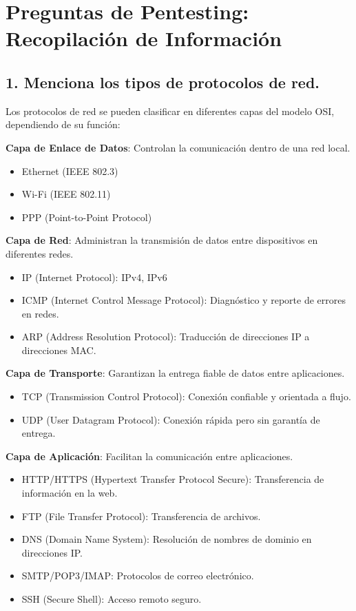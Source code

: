\section{Preguntas de Pentesting: Recopilación de Información}

\subsection{1. Menciona los tipos de protocolos de red.}
Los protocolos de red se pueden clasificar en diferentes capas del modelo OSI, dependiendo de su función:

\textbf{Capa de Enlace de Datos}: Controlan la comunicación dentro de una red local.
\begin{itemize}
    \item Ethernet (IEEE 802.3)
    \item Wi-Fi (IEEE 802.11)
    \item PPP (Point-to-Point Protocol)
\end{itemize}

\textbf{Capa de Red}: Administran la transmisión de datos entre dispositivos en diferentes redes.
\begin{itemize}
    \item IP (Internet Protocol): IPv4, IPv6
    \item ICMP (Internet Control Message Protocol): Diagnóstico y reporte de errores en redes.
    \item ARP (Address Resolution Protocol): Traducción de direcciones IP a direcciones MAC.
\end{itemize}

\textbf{Capa de Transporte}: Garantizan la entrega fiable de datos entre aplicaciones.
\begin{itemize}
    \item TCP (Transmission Control Protocol): Conexión confiable y orientada a flujo.
    \item UDP (User Datagram Protocol): Conexión rápida pero sin garantía de entrega.
\end{itemize}

\textbf{Capa de Aplicación}: Facilitan la comunicación entre aplicaciones.
\begin{itemize}
    \item HTTP/HTTPS (Hypertext Transfer Protocol Secure): Transferencia de información en la web.
    \item FTP (File Transfer Protocol): Transferencia de archivos.
    \item DNS (Domain Name System): Resolución de nombres de dominio en direcciones IP.
    \item SMTP/POP3/IMAP: Protocolos de correo electrónico.
    \item SSH (Secure Shell): Acceso remoto seguro.
\end{itemize}

